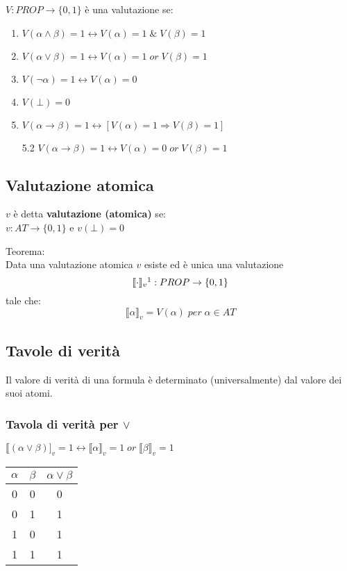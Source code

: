 \documentclass{article}
\theoremstyle{break}
\theoremstyle{break}
\theoremstyle{break}
\theoremstyle{break}
\begin{document}
\( V: PROP \to \{ 0, 1 \} \) è una valutazione se:
\begin{enumerate}
  \item \( V(\alpha \wedge \beta) = 1 \leftrightarrow V(\alpha) = 1\; \&\; V(\beta) = 1 \)
  \item \(V(\alpha \vee \beta) = 1 \leftrightarrow V(\alpha) = 1\; or\; V(\beta) = 1 \)
  \item \( V(\neg \alpha) = 1 \leftrightarrow V(\alpha) = 0 \)
  \item \( V(\bot) = 0 \)
  \item \( V(\alpha \to \beta) = 1 \leftrightarrow [ V(\alpha) = 1 \Rightarrow V(\beta) = 1] \)
  \item[5.2] \( V(\alpha \to \beta) = 1 \leftrightarrow V(\alpha) = 0\; or\; V(\beta) = 1  \)
\end{enumerate}

\subsection{Valutazione atomica}
\( v \) è detta \textbf{valutazione (atomica)} se:\\
\( v: AT \to \{0,1\}\) e \(v(\bot) = 0 \)

\begin{definition}
  Teorema:\\
  Data una valutazione atomica \( v \) esiste ed è unica una valutazione
  \[
    \llbracket \cdot \rrbracket_v\footnote{\(\llbracket  \cdot \rrbracket\) sono parentesi denotazionali, cioè
    indicano che stiamo valutando il valore della valutazione, quindi della semantica}: PROP \to \{0,1\}
    \] tale che:\[
    \llbracket  \alpha \rrbracket_v= V(\alpha) \; per\; \alpha \in AT
  \]
\end{definition}

\subsection{Tavole di verità}
Il valore di verità di una formula è determinato (universalmente) dal
valore dei suoi atomi.

\subsubsection{Tavola di verità per \texorpdfstring{\( \vee \)}{OR} }
\( \llbracket (\alpha \vee \beta)]_v = 1 \leftrightarrow \llbracket \alpha\rrbracket_v = 1\; or\; \llbracket \beta\rrbracket_v = 1 \)
\begin{center}
  \begin{tabular}{c|c|c}
    \( \alpha \) & \( \beta \) & \( \alpha \vee \beta \) \\
    \hline
    0            & 0           & 0                       \\
    0            & 1           & 1                       \\
    1            & 0           & 1                       \\
    1            & 1           & 1                       \\
  \end{tabular}
\end{center}
\end{document}
